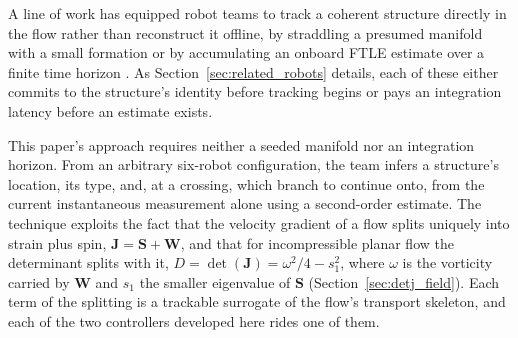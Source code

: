 \documentclass[lettersize,journal]{IEEEtran}
\begin{document}
A line of work has equipped robot teams to track a coherent structure
directly in the flow rather than reconstruct it offline, by straddling a
presumed manifold with a small formation \cite{9,10,11,12} or by
accumulating an onboard FTLE estimate over a finite time horizon
\cite{13}. As Section~\ref{sec:related_robots} details, each of these
either commits to the structure's identity before tracking begins or
pays an integration latency before an estimate exists.

This paper's approach requires neither a seeded manifold nor an
integration horizon. From an arbitrary six-robot configuration, the
team infers a structure's location, its type, and, at a crossing, which
branch to continue onto, from the current instantaneous measurement
alone using a second-order estimate. The technique exploits the fact
that the velocity gradient of a flow splits uniquely into strain plus
spin, $\mathbf{J} = \mathbf{S} + \mathbf{W}$, and that for
incompressible planar flow the determinant splits with it, $D =
\det(\mathbf{J}) = \omega^2/4 - s_1^2$, where $\omega$ is the vorticity
carried by $\mathbf{W}$ and $s_1$ the smaller eigenvalue of $\mathbf{S}$
(Section~\ref{sec:detj_field}). Each term of the splitting is a
trackable surrogate of the flow's transport skeleton, and each of the
two controllers developed here rides one of them.
\end{document}
